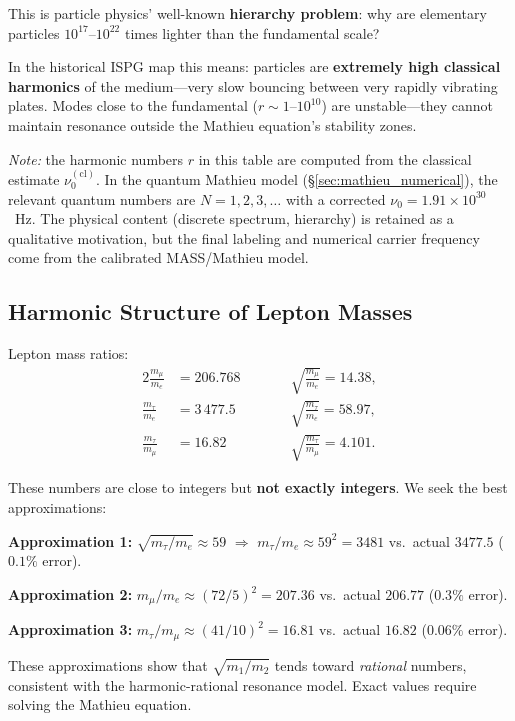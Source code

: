 \documentclass[11pt]{article}
\begin{document}
This is particle physics' well-known \textbf{hierarchy problem}:
why are elementary particles $10^{17}$--$10^{22}$ times lighter
than the fundamental scale?

In the historical ISPG map this means: particles are
\textbf{extremely high classical harmonics} of the medium---very
slow bouncing between very rapidly vibrating plates. Modes close to
the fundamental ($r \sim 1$--$10^{10}$) are unstable---they
cannot maintain resonance outside the Mathieu equation's stability
zones.

\textit{Note:} the harmonic numbers $r$ in this table are
computed from the classical estimate
$\nu_0^{(\mathrm{cl})}$.  In the quantum Mathieu model
(\S\ref{sec:mathieu_numerical}), the relevant quantum
numbers are $N = 1, 2, 3, \ldots$ with a corrected
$\nu_0 = 1.91 \times 10^{30}$~Hz.  The physical content
(discrete spectrum, hierarchy) is retained as a qualitative
motivation, but the final labeling and numerical carrier frequency
come from the calibrated MASS/Mathieu model.

\subsection{Harmonic Structure of Lepton Masses}

Lepton mass ratios:
\begin{alignat}{2}
  \frac{m_\mu}{m_e} &= 206.768
  &\qquad&
  \sqrt{\frac{m_\mu}{m_e}} = 14.38,
  \label{eq:ratio_mu_e}\\[4pt]
  \frac{m_\tau}{m_e} &= 3\,477.5
  &&
  \sqrt{\frac{m_\tau}{m_e}} = 58.97,
  \label{eq:ratio_tau_e}\\[4pt]
  \frac{m_\tau}{m_\mu} &= 16.82
  &&
  \sqrt{\frac{m_\tau}{m_\mu}} = 4.101.
  \label{eq:ratio_tau_mu}
\end{alignat}

These numbers are close to integers but \textbf{not exactly
integers}. We seek the best approximations:

\medskip
\textbf{Approximation 1:}
$\sqrt{m_\tau/m_e} \approx 59$
\quad$\Rightarrow$\quad
$m_\tau/m_e \approx 59^2 = 3481$
\quad vs.\ actual $3477.5$
\quad($0.1\%$ error).

\textbf{Approximation 2:}
$m_\mu/m_e \approx (72/5)^2 = 207.36$
\quad vs.\ actual $206.77$
\quad($0.3\%$ error).

\textbf{Approximation 3:}
$m_\tau/m_\mu \approx (41/10)^2 = 16.81$
\quad vs.\ actual $16.82$
\quad($0.06\%$ error).

\medskip
These approximations show that $\sqrt{m_1/m_2}$ tends toward
\emph{rational} numbers, consistent with the harmonic-rational
resonance model. Exact values require solving the Mathieu equation.
\end{document}
